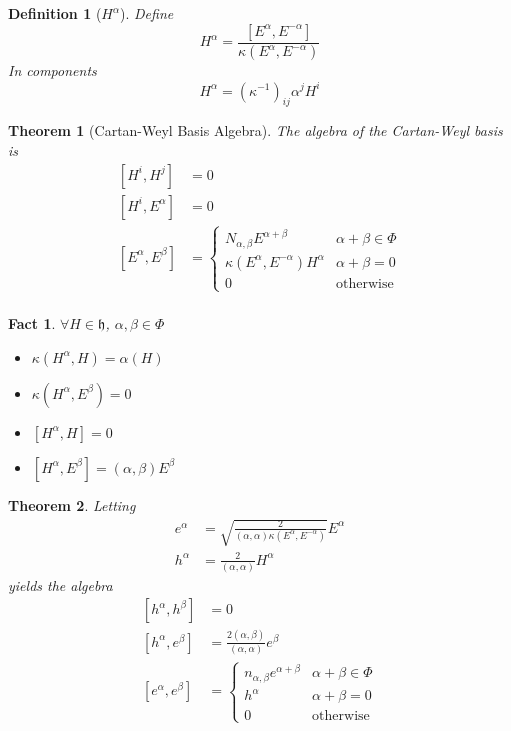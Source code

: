 \documentclass{article}
\newtheorem{theorem}{Theorem}[subsection]
\newtheorem{definition}{Definition}[subsection]
\newtheorem{fact}{Fact}[subsection]
\newcommand{\mf}[1]{\mathfrak{#1}}
\newcommand{\comm}[2][]{\left[ #1, #2 \right]}
\begin{document}
\begin{definition}[$H^\alpha$]
Define 
\[
    H^\alpha = \frac{\comm[E^\alpha]{E^{-\alpha}}}{\kappa\left(E^\alpha,E^{-\alpha}\right)}
\]
In components
\[
H^\alpha = \left( \kappa^{-1}\right)_{ij} \alpha^j H^i
\]
\end{definition}

\begin{theorem}[Cartan-Weyl Basis Algebra]
The algebra of the Cartan-Weyl basis is 
\begin{align*}
    \comm[H^i]{H^j} &= 0 \\
    \comm[H^i]{E^\alpha} &= 0 \\
    \comm[E^\alpha]{E^\beta} &= \left\{ \begin{array}{lc} N_{\alpha,\beta}E^{\alpha+\beta} & \alpha+\beta\in\Phi \\
    \kappa\left(E^\alpha,E^{-\alpha}\right)H^\alpha & \alpha+\beta=0 \\
    0 & \text{otherwise}
    \end{array} \right. \\
\end{align*}
\end{theorem}

\begin{fact}
$\forall H\in\mf{h}$, $\alpha,\beta\in\Phi$
\begin{itemize}
    \item $\kappa\left(H^\alpha,H\right)=\alpha(H)$
    \item $\kappa\left(H^\alpha,E^\beta\right)=0$
    \item $\comm[H^\alpha]{H}=0$
    \item $\comm[H^\alpha]{E^\beta}=(\alpha,\beta)E^\beta$
\end{itemize}
\end{fact}

\begin{theorem}
Letting 
\begin{align*}
    e^\alpha &= \sqrt{\frac{2}{(\alpha,\alpha)\kappa\left(E^\alpha,E^{-\alpha}\right)}}E^\alpha \\
    h^\alpha &= \frac{2}{(\alpha,\alpha)}H^\alpha
\end{align*}
yields the algebra
\begin{align*}
    \comm[h^\alpha]{h^\beta} &= 0 \\
    \comm[h^\alpha]{e^\beta} &= \frac{2(\alpha,\beta)}{(\alpha,\alpha)}e^\beta \\
    \comm[e^\alpha]{e^\beta} &= \left\{ \begin{array}{lc} n_{\alpha,\beta}e^{\alpha+\beta} & \alpha+\beta\in\Phi \\
    h^\alpha & \alpha+\beta=0 \\
    0 & \text{otherwise}
    \end{array} \right.\\
\end{align*}
\end{theorem}
\end{document}
